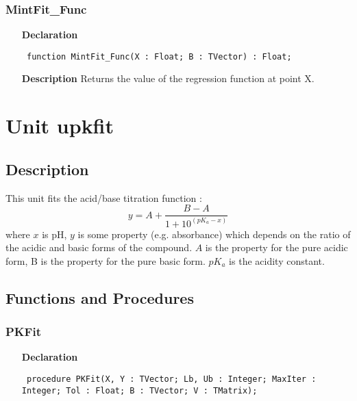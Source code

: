 \documentclass[12pt,a4paper,oneside]{report}
\newcommand{\declarationitem}[1]{\textbf{#1}}
\newcommand{\descriptiontitle}[1]{\textbf{#1}}
\newcommand{\code}[1]{\texttt{#1}}
\begin{document}
\subsubsection{MintFit{\_}Func}
\label{umintfit-MintFit_Func}
\begin{itemize}\item[\declarationitem{Declaration}\hfill]
	\begin{flushleft}
		\code{
			function MintFit{\_}Func(X : Float; B : TVector) : Float;}
		
	\end{flushleft}
	
	\par
	\item[\descriptiontitle{Description}]
	Returns the value of the regression function at point X.
	
\end{itemize}

\section{Unit upkfit}
\label{upkfit}
\subsection{Description}
This unit fits the acid/base titration function :
$$
y=A+\frac{B-A}{1+10^{(pK_a-x)}}
$$
where $x$ is pH, $y$ is some property (e.g. absorbance) which depends on the ratio of the acidic and basic forms of the compound. $A$ is the property for the pure acidic form, B is the property for the pure basic form. $pK_a$ is the acidity constant.
\subsection{Functions and Procedures}
\subsubsection{PKFit}
\label{upkfit-PKFit}
\begin{itemize}\item[\declarationitem{Declaration}\hfill]
	\begin{flushleft}
		\code{
			procedure PKFit(X, Y : TVector; Lb, Ub : Integer; MaxIter : Integer; Tol : Float; B : TVector; V : TMatrix);}
		
	\end{flushleft}
	
\end{itemize}
\end{document}
